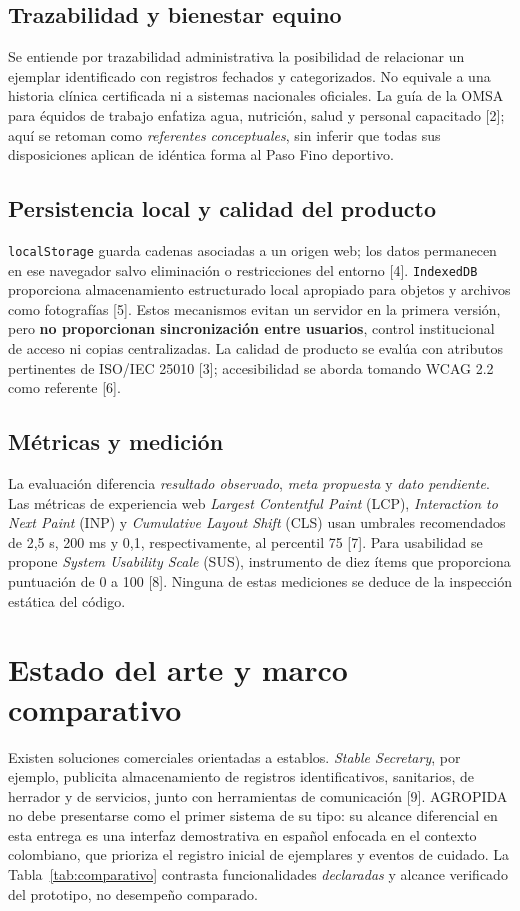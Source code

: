 \documentclass[conference,10pt]{IEEEtran}
\begin{document}
\subsection{Trazabilidad y bienestar equino}
Se entiende por trazabilidad administrativa la posibilidad de relacionar un ejemplar identificado con registros fechados y categorizados. No equivale a una historia clínica certificada ni a sistemas nacionales oficiales. La guía de la OMSA para équidos de trabajo enfatiza agua, nutrición, salud y personal capacitado [2]; aquí se retoman como \emph{referentes conceptuales}, sin inferir que todas sus disposiciones aplican de idéntica forma al Paso Fino deportivo.

\subsection{Persistencia local y calidad del producto}
\texttt{localStorage} guarda cadenas asociadas a un origen web; los datos permanecen en ese navegador salvo eliminación o restricciones del entorno [4]. \texttt{IndexedDB} proporciona almacenamiento estructurado local apropiado para objetos y archivos como fotografías [5]. Estos mecanismos evitan un servidor en la primera versión, pero \textbf{no proporcionan sincronización entre usuarios}, control institucional de acceso ni copias centralizadas. La calidad de producto se evalúa con atributos pertinentes de ISO/IEC 25010 [3]; accesibilidad se aborda tomando WCAG 2.2 como referente [6].

\subsection{Métricas y medición}
La evaluación diferencia \emph{resultado observado}, \emph{meta propuesta} y \emph{dato pendiente}. Las métricas de experiencia web \emph{Largest Contentful Paint} (LCP), \emph{Interaction to Next Paint} (INP) y \emph{Cumulative Layout Shift} (CLS) usan umbrales recomendados de 2,5 s, 200 ms y 0,1, respectivamente, al percentil 75 [7]. Para usabilidad se propone \emph{System Usability Scale} (SUS), instrumento de diez ítems que proporciona puntuación de 0 a 100 [8]. Ninguna de estas mediciones se deduce de la inspección estática del código.

\section{Estado del arte y marco comparativo}
Existen soluciones comerciales orientadas a establos. \emph{Stable Secretary}, por ejemplo, publicita almacenamiento de registros identificativos, sanitarios, de herrador y de servicios, junto con herramientas de comunicación [9]. AGROPIDA no debe presentarse como el primer sistema de su tipo: su alcance diferencial en esta entrega es una interfaz demostrativa en español enfocada en el contexto colombiano, que prioriza el registro inicial de ejemplares y eventos de cuidado. La Tabla~\ref{tab:comparativo} contrasta funcionalidades \emph{declaradas} y alcance verificado del prototipo, no desempeño comparado.
\end{document}
